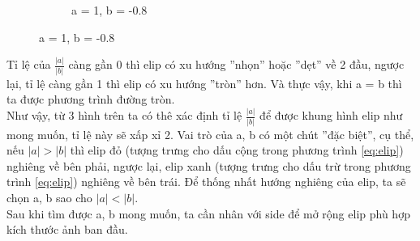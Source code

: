 \documentclass[]{article}
\begin{document}
\begin{figure}[!ht]
\begin{subfigure}[b]{0.3\linewidth}
    \caption{a = 1, b = -0.8}
  \end{subfigure}
\end{figure} \par
Tỉ lệ của $\frac{\left\lvert a \right\rvert}{\left\lvert b\right\rvert }$ càng gần 0 thì elip có xu hướng ''nhọn'' hoặc ''dẹt'' về 2 đầu, ngược lại, tỉ lệ càng gần 1 thì elip có xu hướng ''tròn'' hơn. Và thực vậy, khi a = b thì ta được phương trình đường tròn.\\
Như vậy, từ 3 hình trên ta có thê xác định tỉ lệ $\frac{\left\lvert a \right\rvert}{\left\lvert b\right\rvert }$ để được khung hình elip như mong muốn, tỉ lệ này sẽ xấp xỉ 2. Vai trò của a, b có một chút ''đặc biệt'', cụ thể, nếu $\left\lvert a \right\rvert > \left\lvert b \right\rvert$ thì elip đỏ (tượng trưng cho dấu cộng trong phương trình \ref{eq:elip}) nghiêng về bên phải, ngược lại, elip xanh (tượng trưng cho dấu trừ trong phương trình \ref{eq:elip}) nghiêng về bên trái. Để thống nhất hướng nghiêng của elip, ta sẽ chọn a, b sao cho $\left\lvert a \right\rvert < \left\lvert b \right\rvert$.\\
Sau khi tìm được a, b mong muốn, ta cần nhân với side để mở rộng elip phù hợp kích thước ảnh ban đầu.
\end{document}
